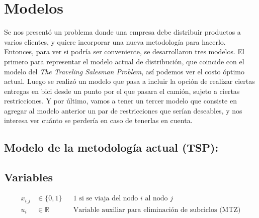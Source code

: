 \documentclass{article}
\begin{document}


\maketitle

\newpage

\section{Modelos}
Se nos presentó un problema donde una empresa debe distribuir productos a varios clientes, y quiere incorporar una nueva metodología para hacerlo. Entonces, para ver si podría ser conveniente, se desarrollaron tres modelos. El primero para representar el modelo actual de distribución, que coincide con el modelo del \textit{The Traveling Salesman Problem}, así podemos ver el costo óptimo actual. Luego se realizó un modelo que pasa a incluir la opción de realizar ciertas entregas en bici desde un punto por el que pasara el camión, sujeto a ciertas restricciones. Y por último, vamos a tener un tercer modelo que consiste en agregar al modelo anterior un par de restricciones que serían deseables, y nos interesa ver cuánto se perdería en caso de tenerlas en cuenta. 

\subsection{Modelo de la metodología actual (TSP):} \label{modelo_actual}
\subsection*{Variables}
\begin{align*}
    x_{i\_j} &\in \{0,1\} && \text{1 si se viaja del nodo } i \text{ al nodo } j \\
    u_i &\in \mathbb{R} && \text{Variable auxiliar para eliminación de subciclos (MTZ)}
\end{align*}
\end{document}
